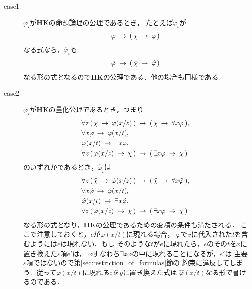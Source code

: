 	\begin{metaprf}\mbox{}
		\begin{description}
			\item[case1] $\varphi_{i}$が{\bf HK}の命題論理の公理であるとき，
				たとえば$\varphi_{i}$が
				\begin{align}
					\varphi \hspace{0.25em}\rightarrow\hspace{0.25em} (\, \chi \hspace{0.25em}\rightarrow\hspace{0.25em} \varphi\, )
				\end{align}
				なる式なら，$\hat{\varphi}_{i}$も
				\begin{align}
					\hat{\varphi} \hspace{0.25em}\rightarrow\hspace{0.25em} (\, \hat{\chi} \hspace{0.25em}\rightarrow\hspace{0.25em} \hat{\varphi}\, )
				\end{align}
				なる形の式となるので{\bf HK}の公理である．他の場合も同様である．
				
			\item[case2] $\varphi_{i}$が{\bf HK}の量化公理であるとき，つまり
				\begin{align}
					&\forall z\, (\, \chi \hspace{0.25em}\rightarrow\hspace{0.25em} \varphi(x/z)\, ) 
						\hspace{0.25em}\rightarrow\hspace{0.25em} (\, \chi \hspace{0.25em}\rightarrow\hspace{0.25em} \forall x \varphi\, ), \\
					&\forall x \varphi \hspace{0.25em}\rightarrow\hspace{0.25em} \varphi(x/t), \\
					&\varphi(x/t) \hspace{0.25em}\rightarrow\hspace{0.25em} \exists x \varphi, \\
					&\forall z\, (\, \varphi(x/z) \hspace{0.25em}\rightarrow\hspace{0.25em} \chi\, )
						\hspace{0.25em}\rightarrow\hspace{0.25em} (\, \exists x \varphi \hspace{0.25em}\rightarrow\hspace{0.25em} \chi\, )
				\end{align}
				のいずれかであるとき，$\hat{\varphi}_{i}$は
				\begin{align}
					&\forall z\, (\, \hat{\chi} \hspace{0.25em}\rightarrow\hspace{0.25em} \hat{\varphi}(x/z)\, ) 
						\hspace{0.25em}\rightarrow\hspace{0.25em} (\, \hat{\chi} \hspace{0.25em}\rightarrow\hspace{0.25em} \forall x \hat{\varphi}\, ), \\
					&\forall x \hat{\varphi} \hspace{0.25em}\rightarrow\hspace{0.25em} \hat{\varphi}(x/t), \\
					&\hat{\varphi}(x/t) \hspace{0.25em}\rightarrow\hspace{0.25em} \exists x \hat{\varphi}, \\
					&\forall z\, (\, \hat{\varphi}(x/z) \hspace{0.25em}\rightarrow\hspace{0.25em} \hat{\chi}\, )
						\hspace{0.25em}\rightarrow\hspace{0.25em} (\, \exists x \hat{\varphi} \hspace{0.25em}\rightarrow\hspace{0.25em} \hat{\chi}\, )
				\end{align}
				なる形の式となり，{\bf HK}の公理であるための変項の条件も満たされる．
				ここで注意しておくと，$e$が$\varphi(x/t)$に現れる場合，
				$\varphi$で$x$に代入された$t$を含むようには$e$は現れない．もし
				そのような$t$が$e$に現れたら，$e$のその$t$を$x$に置き換えた$\varepsilon$項$e'$は，
				$\varphi$すなわち$\exists x \varphi$の中に現れることになるが，$e'$は
				主要$\varepsilon$項ではないので第\ref{sec:restriction_of_formulas}節の
				約束に違反してしまう．従って$\varphi(x/t)$に現れる$e$を$y$に置き換えた式は
				$\hat{\varphi}(x/t)$なる形で書けるのである．
				

\end{description}
\end{metaprf}
